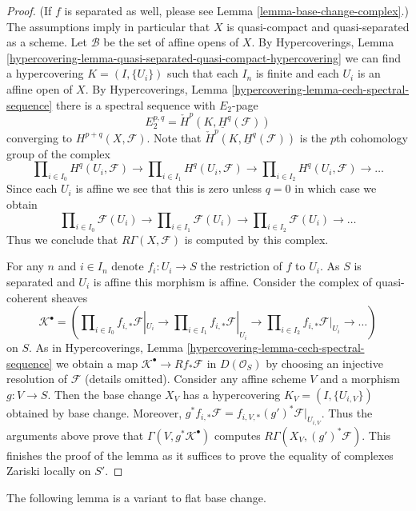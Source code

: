 \begin{proof}
(If $f$ is separated as well, please see
Lemma \ref{lemma-base-change-complex}.)
The assumptions imply in particular that $X$
is quasi-compact and quasi-separated as a scheme.
Let $\mathcal{B}$ be the set of affine opens of $X$. By
Hypercoverings,
Lemma \ref{hypercovering-lemma-quasi-separated-quasi-compact-hypercovering}
we can find a hypercovering $K = (I, \{U_i\})$ such that each
$I_n$ is finite and each $U_i$ is an affine open of $X$. By
Hypercoverings, Lemma \ref{hypercovering-lemma-cech-spectral-sequence}
there is a spectral sequence with $E_2$-page
$$
E_2^{p, q} = \check{H}^p(K, \underline{H}^q(\mathcal{F}))
$$
converging to $H^{p + q}(X, \mathcal{F})$. Note that
$\check{H}^p(K, \underline{H}^q(\mathcal{F}))$ is the $p$th cohomology
group of the complex
$$
\prod\nolimits_{i \in I_0} H^q(U_i, \mathcal{F})
\to
\prod\nolimits_{i \in I_1} H^q(U_i, \mathcal{F})
\to
\prod\nolimits_{i \in I_2} H^q(U_i, \mathcal{F})
\to \ldots
$$
Since each $U_i$ is affine we see that this is zero unless $q = 0$
in which case we obtain
$$
\prod\nolimits_{i \in I_0} \mathcal{F}(U_i)
\to
\prod\nolimits_{i \in I_1} \mathcal{F}(U_i)
\to
\prod\nolimits_{i \in I_2} \mathcal{F}(U_i)
\to \ldots
$$
Thus we conclude that $R\Gamma(X, \mathcal{F})$ is computed by
this complex.

\medskip\noindent
For any $n$ and $i \in I_n$ denote $f_i : U_i \to S$ the restriction of
$f$ to $U_i$. As $S$ is separated and $U_i$ is affine this morphism
is affine. Consider the complex of quasi-coherent sheaves
$$
\mathcal{K}^\bullet = (
\prod\nolimits_{i \in I_0} f_{i, *}\mathcal{F}|_{U_i}
\to
\prod\nolimits_{i \in I_1} f_{i, *}\mathcal{F}|_{U_i}
\to
\prod\nolimits_{i \in I_2} f_{i, *}\mathcal{F}|_{U_i}
\to \ldots )
$$
on $S$. As in
Hypercoverings, Lemma \ref{hypercovering-lemma-cech-spectral-sequence}
we obtain a map $\mathcal{K}^\bullet \to Rf_*\mathcal{F}$ in
$D(\mathcal{O}_S)$ by choosing an injective resolution of $\mathcal{F}$
(details omitted). Consider any affine scheme $V$ and a morphism
$g : V \to S$. Then the base change $X_V$ has a hypercovering
$K_V = (I, \{U_{i, V}\})$ obtained by base change. Moreover,
$g^*f_{i, *}\mathcal{F} = f_{i, V, *}(g')^*\mathcal{F}|_{U_{i, V}}$.
Thus the arguments above prove that $\Gamma(V, g^*\mathcal{K}^\bullet)$
computes $R\Gamma(X_V, (g')^*\mathcal{F})$.
This finishes the proof of the lemma as it suffices to prove
the equality of complexes Zariski locally on $S'$.
\end{proof}

\noindent
The following lemma is a variant to flat base change.

